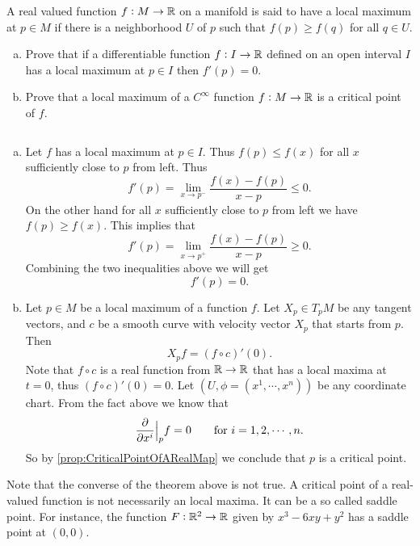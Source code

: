 \begin{problem}
	A real valued function $ f:M\to \mathbb{R} $ on a manifold is said to have a local maximum at $ p \in M $ if there is a neighborhood $ U $ of $ p $ such that $ f(p) \geq f(q) $ for all $ q \in U $.
	\begin{enumerate}[(a)]
		\item Prove that if a differentiable function $ f:I\to \mathbb{R} $ defined on an open interval $ I $ has a local maximum at $ p \in I $ then $ f'(p) = 0 $.
		\item Prove that a local maximum of a $ C^\infty $ function $ f:M\to \mathbb{R} $ is a critical point of $ f $.
	\end{enumerate}
\end{problem}
\begin{solution}
	$\ $
	\begin{enumerate}[(a)]
		\item Let $ f $ has a local maximum at $ p \in I $. Thus $ f(p) \leq f(x) $ for all $ x $ sufficiently close to $ p $ from left. Thus
		\[ f'(p) = \lim_{x \to p^-} \frac{f(x) - f(p)}{x-p} \leq 0. \]
		On the other hand for all $ x $ sufficiently close to $ p $ from left we have $ f(p) \geq f(x) $. This implies that 
		\[ f'(p) = \lim_{x \to p^+} \frac{f(x) - f(p)}{x-p} \geq 0. \]
		Combining the two inequalities above we will get
		\[ f'(p) = 0. \]
		\item Let $ p \in M $ be a local maximum of a function $ f $. Let $ X_p \in T_pM $ be any tangent vectors, and $ c $ be a smooth curve with velocity vector $ X_p $ that starts from $ p $. Then 
		\[ X_p f = (f\circ c)'(0). \]
		Note that $ f\circ c $ is a real function from $ \mathbb{R}\to \mathbb{R} $ that has a local maxima at $ t = 0 $, thus $ (f\circ c)'(0) = 0 $. Let $ (U,\phi = (x^1,\cdots,x^n)) $ be any coordinate chart. From the fact above we know that 
		\[ \frac{\partial}{\partial  x^i}\big|_{p} f = 0 \qquad \text{for $ i = 1,2,\cdots,n $}. \]
		So by \autoref{prop:CriticalPointOfARealMap} we conclude that $ p $ is a critical point.
	\end{enumerate}
	\begin{carefull}
		Note that the converse of the theorem above is not true. A critical point of a real-valued function is not necessarily an local maxima. It can be a so called saddle point. For instance, the function $ F:\mathbb{R}^2 \to \mathbb{R}$ given by $x^3 -6xy + y^2 $ has a saddle point at $ (0,0) $.
	\end{carefull}
\end{solution}


